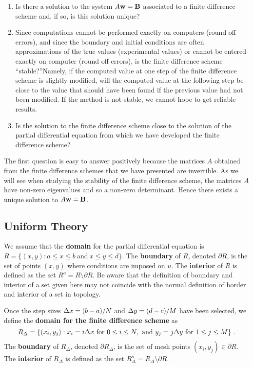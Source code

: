 \begin{enumerate}
\item Is there a solution to the system $A\mathbf{w} = \mathbf{B}$
  associated to a finite difference scheme and, if so, is this
  solution unique?
\item Since computations cannot be performed exactly on computers
  (round off errors), and since the boundary and initial conditions
  are often approximations of the true values (experimental values) or
  cannot be entered exactly on computer (round off errors), is the
  finite difference scheme ``stable?''\quad  Namely, if the computed
  value at one step of the finite difference scheme is slightly modified,
  will the computed value at the following step be close to the value
  that should have been found if the previous value had not been
  modified.  If the method is not stable, we cannot hope to get
  reliable results.
\item Is the solution to the finite difference scheme close to the
  solution of the partial differential equation from which we have
  developed the finite difference scheme?
\end{enumerate}

The first question is easy to answer positively because the matrices
$A$ obtained from the finite difference schemes that we have presented
are invertible.  As we will see when studying the stability of the
finite difference scheme, the matrices $A$ have non-zero eigenvalues
and so a non-zero determinant.  Hence there exists a unique solution
to $A\mathbf{w}=\mathbf{B}$.

\subsection{Uniform Theory}

We assume that the {\bfseries domain} for the partial differential
equation is
$R = \{ (x,y) : a \leq x \leq b \ \text{and} \ x \leq y \leq d \}$.
The {\bfseries boundary} of $R$, denoted $\partial R$, is the set of points
$(x,y)$ where conditions are imposed on $u$.  The {\bfseries interior}
of $R$ is defined as the set $R^o = R \setminus \partial R$. 
Be aware that the definition of boundary and interior of a set given
here may not coincide with the normal definition of border and
interior of a set in topology.

Once the step sizes $\Delta{x} = (b-a)/N$ and $\Delta{y}=(d-c)/M$ have
been selected, we define the
{\bfseries domain for the finite difference scheme} as
\begin{equation} \label{fdm_DomianDef}
R_\Delta = \{ (x_i,y_j) : x_i = i \dtx{x} \ \text{for} \ 0 \leq i \leq N,
\ \text{and} \ y_j = j \dtx{y} \ \text{for} \ 1 \leq j \leq M \} \ .
\end{equation}
The {\bfseries boundary} of $R_\Delta$, denoted $\partial R_\Delta$, is the set of
mesh points $(x_i,y_j) \in \partial R$.  The
{\bfseries interior} of $R_\Delta$ is defined as the set
$R^o_\Delta = R_\Delta \setminus \partial R$.

